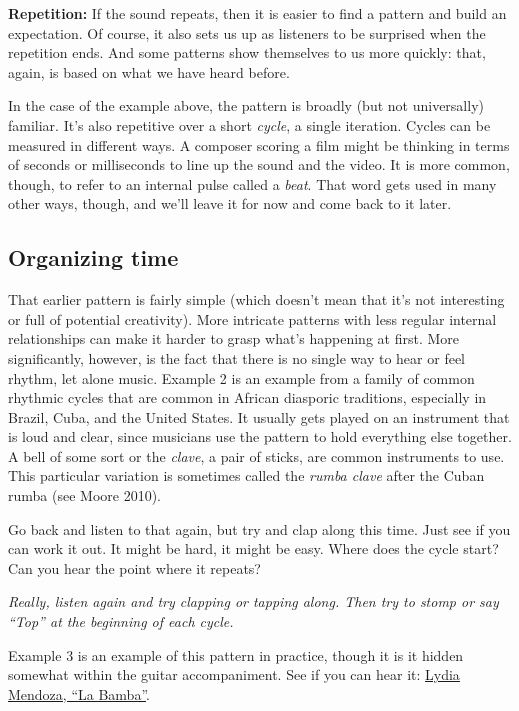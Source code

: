 \documentclass[twoside]{article}
\begin{document}
\textbf{Repetition:} If the sound repeats, then it is easier to find a
pattern and build an expectation. Of course, it also sets us up as
listeners to be surprised when the repetition ends. And some patterns
show themselves to us more quickly: that, again, is based on what we
have heard before.

In the case of the example above, the pattern is broadly (but not
universally) familiar. It's also repetitive over a short \emph{cycle}, a
single iteration. Cycles can be measured in different ways. A composer
scoring a film might be thinking in terms of seconds or milliseconds to
line up the sound and the video. It is more common, though, to refer to
an internal pulse called a \emph{beat}. That word gets used in many
other ways, though, and we'll leave it for now and come back to it
later.

\hypertarget{organizing-time}{%
\subsection*{Organizing time}\label{organizing-time}}

That earlier pattern is fairly simple (which doesn't mean that it's not
interesting or full of potential creativity). More intricate patterns
with less regular internal relationships can make it harder to grasp
what's happening at first. More significantly, however, is the fact that
there is no single way to hear or feel rhythm, let alone music. Example 2 is
an example from a family of common rhythmic cycles that are common in
African diasporic traditions, especially in Brazil, Cuba, and the United
States. It usually gets played on an instrument that is loud and clear,
since musicians use the pattern to hold everything else together. A bell
of some sort or the \emph{clave}, a pair of sticks, are common
instruments to use. This particular variation is sometimes called the
\emph{rumba clave} after the Cuban rumba (see Moore 2010).

Go back and listen to that again, but try and clap along this time. Just
see if you can work it out. It might be hard, it might be easy. Where
does the cycle start? Can you hear the point where it repeats?

\emph{Really, listen again and try clapping or tapping along. Then try
to stomp or say ``Top'' at the beginning of each cycle.}

Example 3 is an example of this pattern in practice, though it is it hidden
somewhat within the guitar accompaniment. See if you can hear it: \href{https://folkways.si.edu/lydia-mendoza/la-bamba-rumba/latin-world/music/track/smithsonian}{Lydia
Mendoza, ``La Bamba''}.
\end{document}

